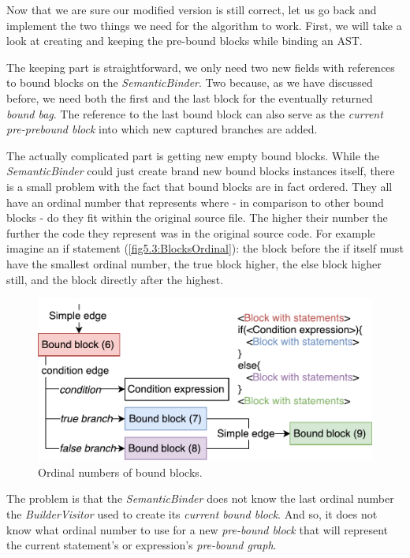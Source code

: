 Now that we are sure our modified version is still correct, let us go back and implement the two things we need for the algorithm to work. First, we will take a look at creating and keeping the pre-bound blocks while binding an AST.

The keeping part is straightforward, we only need two new fields with references to bound blocks on the \emph{SemanticBinder}. Two because, as we have discussed before, we need both the first and the last block for the eventually returned \emph{bound bag}. The reference to the last bound block can also serve as the \emph{current pre-prebound block} into which new captured branches are added.

The actually complicated part is getting new empty bound blocks. While the \emph{SemanticBinder} could just create brand new bound blocks instances itself, there is a small problem with the fact that bound blocks are in fact ordered. They all have an ordinal number that represents where - in comparison to other bound blocks - do they fit within the original source file. The higher their number the further the code they represent was in the original source code. For example imagine an if statement (\autoref{fig5.3:BlocksOrdinal}): the block before the if itself must have the smallest ordinal number, the true block higher, the else block higher still, and the block directly after the highest.

\begin{figure}[H]
	\centering	
	\includegraphics[scale=0.75]{../img/5_3_blockOrdinal}	
	\caption{Ordinal numbers of bound blocks.}
	\label{fig5.3:BlocksOrdinal}
\end{figure}

The problem is that the \emph{SemanticBinder} does not know the last ordinal number the \emph{BuilderVisitor} used to create its \emph{current bound block}. And so, it does not know what ordinal number to use for a new \emph{pre-bound block} that will represent the current statement’s or expression’s \emph{pre-bound graph}.

